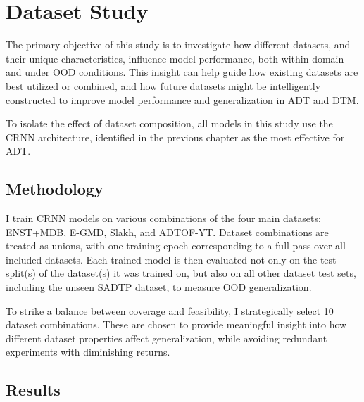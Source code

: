 \chapter{Dataset Study}\label{Study2}

The primary objective of this study is to investigate how different datasets, and their unique characteristics, influence model performance, both within-domain and under \gls{OOD} conditions. This insight can help guide how existing datasets are best utilized or combined, and how future datasets might be intelligently constructed to improve model performance and generalization in \acrfull{ADT} and \acrfull{DTM}.

To isolate the effect of dataset composition, all models in this study use the \acrfull{CRNN} architecture, identified in the previous chapter as the most effective for \gls{ADT}.

\section{Methodology}

I train \acrshort{CRNN} models on various combinations of the four main datasets: ENST+MDB, E-GMD, Slakh, and ADTOF-YT. Dataset combinations are treated as unions, with one training epoch corresponding to a full pass over all included datasets. Each trained model is then evaluated not only on the test split(s) of the dataset(s) it was trained on, but also on all other dataset test sets, including the unseen SADTP dataset, to measure \gls{OOD} generalization.

To strike a balance between coverage and feasibility, I strategically select 10 dataset combinations. These are chosen to provide meaningful insight into how different dataset properties affect generalization, while avoiding redundant experiments with diminishing returns.

\section{Results}

